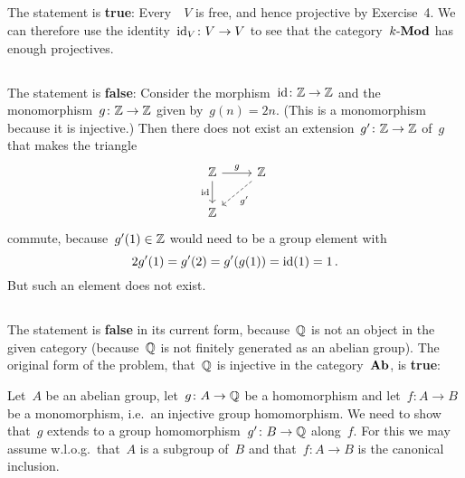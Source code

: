 \subsection{}

The statement is \textbf{true}:
Every~{\kvs}~$V$ is free, and hence projective by Exercise~4.
We can therefore use the identity~$\operatorname{id}_V \colon V \to V$ to see that the category~$\text{$k$-$\mathbf{Mod}$}$ has enough projectives.





\subsection{}

The statement is \textbf{false}:
Consider the morphism~$\operatorname{id} \colon \mathbb{Z} \to \mathbb{Z}$ and the monomorphism~$g \colon \mathbb{Z} \to \mathbb{Z}$ given by~$g(n) = 2n$.
(This is a monomorphism because it is injective.)
Then there does not exist an extension~$g' \colon \mathbb{Z} \to \mathbb{Z}$ of~$g$ that makes the triangle
\[
  \begin{tikzcd}
      \Integer
      \arrow{r}[above]{g}
      \arrow{d}[left]{\id}
    & \Integer
      \arrow[dashed]{dl}[below right]{g'}
    \\
      \Integer
    & {}
  \end{tikzcd}
\]
commute, because~$g'(1) \in \mathbb{Z}$ would need to be a group element with
\[
    2 g'(1)
  = g'(2)
  = g'(g(1))
  = \operatorname{id}(1)
  = 1 \,.
\]
But such an element does not exist.





\subsection{}

The statement is \textbf{false} in its current form, because~$\mathbb{Q}$ is not an object in the given category (because~$\mathbb{Q}$ is not finitely generated as an abelian group).
The original form of the problem, that~$\mathbb{Q}$ is injective in the category~$\mathbf{Ab}$, is \textbf{true}:

Let~$A$ be an abelian group, let~$g \colon A \to \mathbb{Q}$ be a homomorphism and let~$f \colon A \to B$ be a monomorphism, i.e.\ an injective group homomorphism.
We need to show that~$g$ extends to a group homomorphism~$g' \colon B \to \mathbb{Q}$ along~$f$.
For this we may assume w.l.o.g.\ that~$A$ is a subgroup of~$B$ and that~$f \colon A \to B$ is the canonical inclusion.

